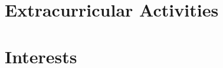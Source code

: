 \documentclass[12pt]{report} %
\begin{document}
\section{Extracurricular Activities}

\extracurricular{}



\section{Interests}

\interests{}


\end{document}
